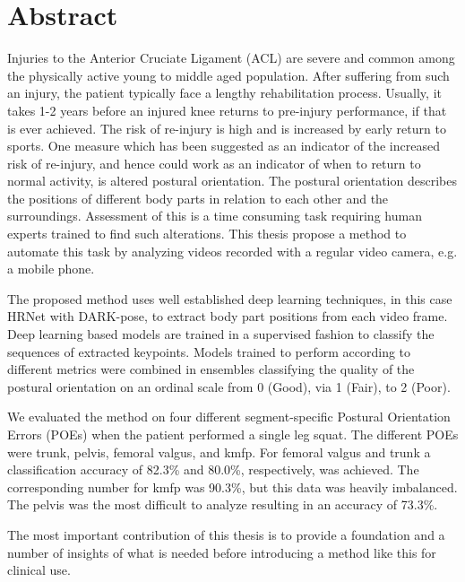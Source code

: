 \tableofcontents
{
\chapter*{Abstract}
Injuries to the Anterior Cruciate Ligament (ACL) are severe and common among the physically active young to middle aged population. After suffering from such an injury, the patient typically face a lengthy rehabilitation process. Usually, it takes 1-2 years before an injured knee returns to pre-injury performance, if that is ever achieved. The risk of re-injury is high and is increased by early return to sports. One measure which has been suggested as an indicator of the increased risk of re-injury, and hence could work as an indicator of when to return to normal activity, is altered postural orientation. The postural orientation describes the positions of different body parts in relation to each other and the surroundings. Assessment of this is a time consuming task requiring human experts trained to find such alterations. This thesis propose a method to automate this task by analyzing videos recorded with a regular video camera, e.g. a mobile phone.

The proposed method uses well established deep learning techniques, in this case HRNet with DARK-pose, to extract body part positions from each video frame. Deep learning based models are trained in a supervised fashion to classify the sequences of extracted keypoints. Models trained to perform according to different metrics were combined in ensembles classifying the quality of the postural orientation on an ordinal scale from 0 (Good), via 1 (Fair), to 2 (Poor).

We evaluated the method on four different segment-specific Postural Orientation Errors (POEs) when the patient performed a single leg squat. The different POEs were trunk, pelvis, femoral valgus, and \gls{kmfp}. For femoral valgus and trunk a classification accuracy of 82.3\% and 80.0\%, respectively, was achieved. The corresponding number for \gls{kmfp} was 90.3\%, but this data was heavily imbalanced. The pelvis was the most difficult to analyze resulting in an accuracy of 73.3\%.

The most important contribution of this thesis is to provide a foundation and a number of insights of what is needed before introducing a method like this for clinical use.


}
